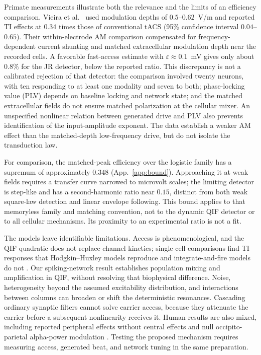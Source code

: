 \documentclass[11pt,a4paper]{article}
\begin{document}
Primate measurements illustrate both the relevance and the limits of an efficiency
comparison. Vieira et al.\ \cite{vieira2024} used modulation depths of
$0.5$--$0.62$~V/m and reported TI effects at $0.34$ times those of conventional
tACS (95\% confidence interval $0.04$--$0.65$). Their within-electrode AM comparison
compensated for frequency-dependent current shunting and matched extracellular
modulation depth near the recorded cells. A favorable fast-access estimate with
$\varepsilon\approx0.1$~mV gives only about $0.8\%$ for the JR detector, below the
reported ratio. This discrepancy is not a calibrated rejection of that detector:
the comparison involved twenty neurons, with ten responding to at least one
modality and seven to both; phase-locking value (PLV) depends on baseline locking
and network state; and the matched extracellular fields do not ensure matched
polarization at the cellular mixer. An unspecified nonlinear relation between
generated drive and PLV also prevents identification of the input-amplitude
exponent. The data establish a weaker AM effect than the matched-depth
low-frequency drive, but do not isolate the transduction law.

For comparison, the matched-peak efficiency over the logistic family has a supremum
of approximately $0.348$ (App.~\ref{app:bound}). Approaching it at weak fields
requires a transfer curve narrowed to microvolt scales; the limiting detector is
step-like and has a second-harmonic ratio near $0.15$, distinct from both weak
square-law detection and linear envelope following. This bound applies to that
memoryless family and matching convention, not to the dynamic QIF detector or to
all cellular mechanisms. Its proximity to an experimental ratio is not a fit.

The models leave identifiable limitations. Access is phenomenological, and the
QIF quadratic does not replace channel kinetics; single-cell comparisons find
TI responses that Hodgkin--Huxley models reproduce and integrate-and-fire models
do not \cite{plovie2025}. Our spiking-network result establishes population mixing
and amplification in QIF, without resolving that biophysical difference. Noise,
heterogeneity beyond the assumed excitability distribution, and interactions
between columns can broaden or shift the deterministic resonances. Cascading
ordinary synaptic filters cannot solve carrier access, because they attenuate
the carrier before a subsequent nonlinearity receives it. Human results are also
mixed, including reported peripheral effects without central effects
\cite{iszak2023} and null occipito-parietal alpha-power modulation
\cite{mansourinezhad2025}. Testing the proposed mechanism requires measuring
access, generated beat, and network tuning in the same preparation.
\end{document}
